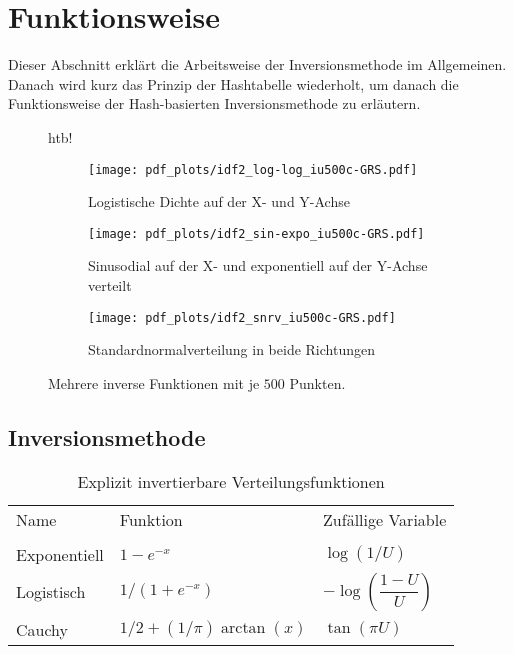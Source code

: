 \section{Funktionsweise}
\label{funktion}

Dieser Abschnitt erklärt die Arbeitsweise der Inversionsmethode im Allgemeinen. 
Danach wird kurz das Prinzip der Hashtabelle wiederholt, um danach die 
Funktionsweise der Hash-basierten Inversionsmethode zu erläutern.

\begin{figure*}{htb!}
    \centering
    \begin{subfigure}[b]{.3\textwidth}
        \centering
        \texttt{[image: pdf\_plots/idf2\_log-log\_iu500c-GRS.pdf]}
        \caption{Logistische Dichte auf der X- und Y-Achse}
        \label{fig:loglog_examplePlot}
    \end{subfigure}
    \hfill
    \begin{subfigure}[b]{.3\textwidth}
        \centering
        \texttt{[image: pdf\_plots/idf2\_sin-expo\_iu500c-GRS.pdf]}
        \caption{Sinusodial auf der X- und exponentiell auf der Y-Achse verteilt}
        \label{fig:sinexpo_examplePlot}
    \end{subfigure}
    \hfill
    \begin{subfigure}[b]{.3\textwidth}
        \centering
        \texttt{[image: pdf\_plots/idf2\_snrv\_iu500c-GRS.pdf]}
        \caption{Standardnormalverteilung in beide Richtungen}
        \label{fig:snrv_examplePlot}
    \end{subfigure}
    \caption{Mehrere inverse Funktionen mit je $500$ Punkten.}
    \label{fig:examplePlot}
\end{figure*}


\subsection{Inversionsmethode}
\begin{table}[htb!]
    \centering
    \begin{tabular}{lll}
    Name         & Funktion & Zufällige Variable \\
                 &          &                    \\
    Exponentiell & $1 - e^{-x}$ & $\log(1/U)$ \\
    Logistisch   & $1 / (1 + e^{-x})$ & $-\log(\dfrac{1-U}{U})$ \\
    Cauchy       & $1/2 + (1/\pi) \arctan(x)$ & $\tan(\pi U)$
    \end{tabular}
    \caption{Explizit invertierbare Verteilungsfunktionen \cite{devroye-non_uniform_random_variate-1986}}
    \label{tab:invFuncs}
\end{table}

